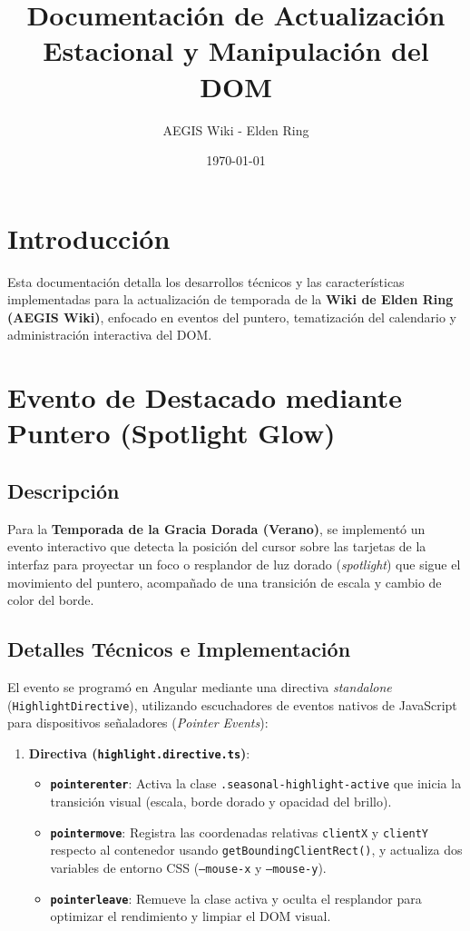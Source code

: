 \documentclass[11pt,a4paper]{article}
\title{Documentación de Actualización Estacional y Manipulación del DOM}
\author{AEGIS Wiki - Elden Ring}
\date{\today}
\begin{document}
\maketitle

\section{Introducción}
Esta documentación detalla los desarrollos técnicos y las características implementadas para la actualización de temporada de la \textbf{Wiki de Elden Ring (AEGIS Wiki)}, enfocado en eventos del puntero, tematización del calendario y administración interactiva del DOM.

\section{Evento de Destacado mediante Puntero (Spotlight Glow)}

\subsection{Descripción}
Para la \textbf{Temporada de la Gracia Dorada (Verano)}, se implementó un evento interactivo que detecta la posición del cursor sobre las tarjetas de la interfaz para proyectar un foco o resplandor de luz dorado (\textit{spotlight}) que sigue el movimiento del puntero, acompañado de una transición de escala y cambio de color del borde.

\subsection{Detalles Técnicos e Implementación}
El evento se programó en Angular mediante una directiva \textit{standalone} (\texttt{HighlightDirective}), utilizando escuchadores de eventos nativos de JavaScript para dispositivos señaladores (\textit{Pointer Events}):

\begin{enumerate}
    \item \textbf{Directiva (\texttt{highlight.directive.ts})}:
    \begin{itemize}
        \item \textbf{\texttt{pointerenter}}: Activa la clase \texttt{.seasonal-highlight-active} que inicia la transición visual (escala, borde dorado y opacidad del brillo).
        \item \textbf{\texttt{pointermove}}: Registra las coordenadas relativas \texttt{clientX} y \texttt{clientY} respecto al contenedor usando \texttt{getBoundingClientRect()}, y actualiza dos variables de entorno CSS (\texttt{--mouse-x} y \texttt{--mouse-y}).
        \item \textbf{\texttt{pointerleave}}: Remueve la clase activa y oculta el resplandor para optimizar el rendimiento y limpiar el DOM visual.
    \end{itemize}
\end{enumerate}
\end{document}
